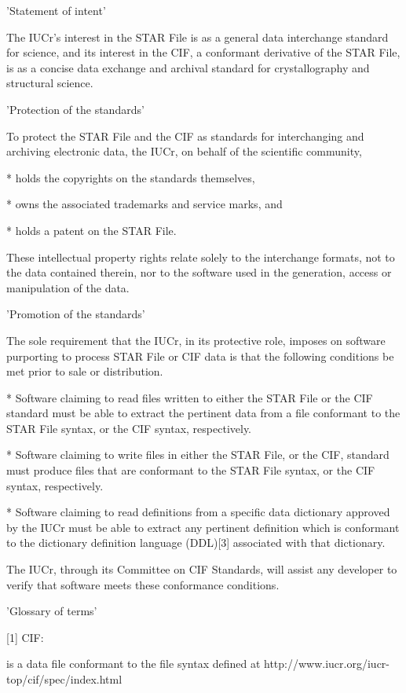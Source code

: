 'Statement of intent'

The IUCr's interest in the STAR File is as a general data interchange
standard for science, and its interest in the CIF, a conformant derivative
of the STAR File, is as a concise data exchange and archival standard for
crystallography and structural science.

'Protection of the standards'

To protect the STAR File and the CIF as standards for interchanging and
archiving electronic data, the IUCr, on behalf of the scientific community,

   * holds the copyrights on the standards themselves,

   * owns the associated trademarks and service marks, and

   * holds a patent on the STAR File.

These intellectual property rights relate solely to the interchange formats,
not to the data contained therein, nor to the software used in the
generation, access or manipulation of the data.

'Promotion of the standards'

The sole requirement that the IUCr, in its protective role, imposes on
software purporting to process STAR File or CIF data is that the following
conditions be met prior to sale or distribution.

   * Software claiming to read files written to either the STAR File or the
CIF standard must be able to extract the pertinent data from a file
conformant to the STAR File syntax, or the CIF syntax, respectively.

   * Software claiming to write files in either the STAR File, or the CIF,
standard must produce files that are conformant to the STAR File
syntax, or the CIF syntax, respectively.

   * Software claiming to read definitions from a specific data dictionary
approved by the IUCr must be able to extract any pertinent definition
which is conformant to the dictionary definition language (DDL)[3]
associated with that dictionary.

The IUCr, through its Committee on CIF Standards, will assist any developer
to verify that software meets these conformance conditions.

'Glossary of terms'

[1] CIF:

is a data file conformant to the file syntax defined at
http://www.iucr.org/iucr-top/cif/spec/index.html

